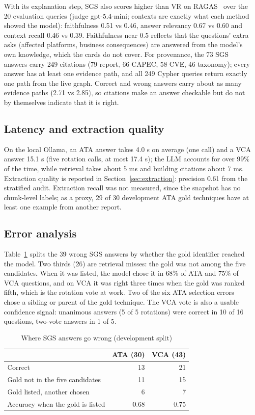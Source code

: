 \documentclass[conference]{IEEEtran}
\begin{document}
With its explanation step, SGS also scores higher than VR on RAGAS~\cite{es2024ragas} over the 20 evaluation queries (judge gpt-5.4-mini; contexts are exactly what each method showed the model): faithfulness 0.51 vs 0.46, answer relevancy 0.67 vs 0.60 and context recall 0.46 vs 0.39. Faithfulness near 0.5 reflects that the questions' extra asks (affected platforms, business consequences) are answered from the model's own knowledge, which the cards do not cover. For provenance, the 73 SGS answers carry 249 citations (79 report, 66 CAPEC, 58 CVE, 46 taxonomy); every answer has at least one evidence path, and all 249 Cypher queries return exactly one path from the live graph. Correct and wrong answers carry about as many evidence paths (2.71 vs 2.85), so citations make an answer checkable but do not by themselves indicate that it is right.

\subsection{Latency and extraction quality}

On the local Ollama, an ATA answer takes 4.0 s on average (one call) and a VCA answer 15.1 s (five rotation calls, at most 17.4 s); the LLM accounts for over 99\% of the time, while retrieval takes about 5 ms and building citations about 7 ms. Extraction quality is reported in Section~\ref{sec:extraction}: precision 0.61 from the stratified audit. Extraction recall was not measured, since the snapshot has no chunk-level labels; as a proxy, 29 of 30 development ATA gold techniques have at least one example from another report.

\subsection{Error analysis}

Table~\ref{tab:errors} splits the 39 wrong SGS answers by whether the gold identifier reached the model. Two thirds (26) are retrieval misses: the gold was not among the five candidates. When it was listed, the model chose it in 68\% of ATA and 75\% of VCA questions, and on VCA it was right three times when the gold was ranked fifth, which is the rotation vote at work. Two of the six ATA selection errors chose a sibling or parent of the gold technique. The VCA vote is also a usable confidence signal: unanimous answers (5 of 5 rotations) were correct in 10 of 16 questions, two-vote answers in 1 of 5.

\begin{table}[t]
\caption{Where SGS answers go wrong (development split)}
\label{tab:errors}
\centering
\footnotesize
\begin{tabular}{@{}l r r@{}}
\toprule
& ATA (30) & VCA (43) \\
\midrule
Correct & 13 & 21 \\
Gold not in the five candidates & 11 & 15 \\
Gold listed, another chosen & 6 & 7 \\
\midrule
Accuracy when the gold is listed & 0.68 & 0.75 \\
\bottomrule
\end{tabular}
\end{table}
\end{document}
